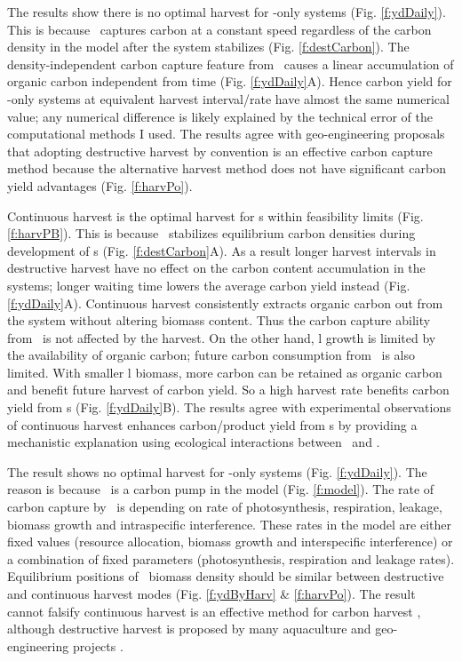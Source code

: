 \documentclass[../thesis.tex]{subfiles} %
\begin{document}
The results show there is no optimal harvest for \phy-only systems (Fig. \ref{f:ydDaily}).  This is because \phy\ captures carbon at a constant speed regardless of the carbon density in the model after the system stabilizes (Fig. \ref{f:destCarbon}).  The density-independent carbon capture feature from \phy\ causes a linear accumulation of organic carbon independent from time (Fig. \ref{f:ydDaily}A).  Hence carbon yield for \phy-only systems at equivalent harvest interval/rate have almost the same numerical value; any numerical difference is likely explained by the technical error of the computational methods I used.  The results agree with geo-engineering proposals that adopting destructive harvest by convention is an effective carbon capture method because the alternative harvest method does not have significant carbon yield advantages (Fig. \ref{f:harvPo}).

Continuous harvest is the optimal harvest for \pbs s within feasibility limits (Fig. \ref{f:harvPB}).  This is because \bac\ stabilizes equilibrium carbon densities during development of \pbs s (Fig. \ref{f:destCarbon}A).  As a result longer harvest intervals in destructive harvest have no effect on the carbon content accumulation in the systems; longer waiting time lowers the average carbon yield instead (Fig. \ref{f:ydDaily}A).  Continuous harvest consistently extracts organic carbon out from the system without altering biomass content.  Thus the carbon capture ability from \phy\ is not affected by the harvest.  On the other hand, \bac l growth is limited by the availability of organic carbon; future carbon consumption from \bac\ is also limited.  With smaller \bac l biomass, more carbon can be retained as organic carbon and benefit future harvest of carbon yield.  So a high harvest rate benefits carbon yield from \pbs s (Fig. \ref{f:ydDaily}B).  The results agree with experimental observations of continuous harvest enhances carbon/product yield from \pbs s \autocite{kim2008anaerobic,choix2012enhanced1,choix2012enhanced2,leyva2014accumulation} by providing a mechanistic explanation using ecological interactions between \phy\ and \bac.


The result shows no optimal harvest for \phy-only systems (Fig. \ref{f:ydDaily}).  The reason is because \phy\ is a carbon pump in the model (Fig. \ref{f:model}).  The rate of carbon capture by \phy\ is depending on rate of photosynthesis, respiration, leakage, biomass growth and intraspecific interference.  These rates in the model are either fixed values (resource allocation, biomass growth and interspecific interference) or a combination of fixed parameters (photosynthesis, respiration and leakage rates).  Equilibrium positions of \phy\ biomass density should be similar between destructive and continuous harvest modes (Fig. \ref{f:ydByHarv} \& \ref{f:harvPo}).  The result cannot falsify continuous harvest is an effective method for carbon harvest \autocite{fuentes2016impact}, although destructive harvest is proposed by many aquaculture and geo-engineering projects \autocite{lawrence2014efficiency,krause2016substantial}.
\end{document}
